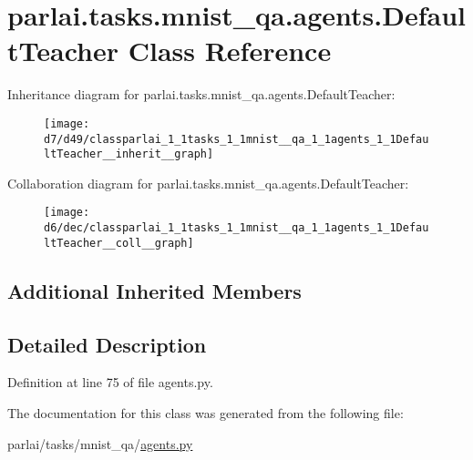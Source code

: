 \hypertarget{classparlai_1_1tasks_1_1mnist__qa_1_1agents_1_1DefaultTeacher}{}\section{parlai.\+tasks.\+mnist\+\_\+qa.\+agents.\+Default\+Teacher Class Reference}
\label{classparlai_1_1tasks_1_1mnist__qa_1_1agents_1_1DefaultTeacher}


Inheritance diagram for parlai.\+tasks.\+mnist\+\_\+qa.\+agents.\+Default\+Teacher\+:
\nopagebreak
\begin{figure}[H]
\begin{center}
\leavevmode
\texttt{[image: d7/d49/classparlai\_1\_1tasks\_1\_1mnist\_\_qa\_1\_1agents\_1\_1DefaultTeacher\_\_inherit\_\_graph]}
\end{center}
\end{figure}


Collaboration diagram for parlai.\+tasks.\+mnist\+\_\+qa.\+agents.\+Default\+Teacher\+:
\nopagebreak
\begin{figure}[H]
\begin{center}
\leavevmode
\texttt{[image: d6/dec/classparlai\_1\_1tasks\_1\_1mnist\_\_qa\_1\_1agents\_1\_1DefaultTeacher\_\_coll\_\_graph]}
\end{center}
\end{figure}
\subsection*{Additional Inherited Members}


\subsection{Detailed Description}


Definition at line 75 of file agents.\+py.



The documentation for this class was generated from the following file\+:\begin{DoxyCompactItemize}
\item 
parlai/tasks/mnist\+\_\+qa/\hyperlink{parlai_2tasks_2mnist__qa_2agents_8py}{agents.\+py}\end{DoxyCompactItemize}
